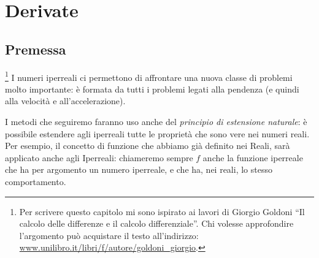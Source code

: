 



\chapter{Derivate}

% 

\section{Premessa}
\footnote{Per scrivere questo capitolo mi sono ispirato 
ai lavori di Giorgio Goldoni ``Il calcolo delle differenze e il calcolo 
differenziale''. 
Chi volesse approfondire l'argomento può acquistare il testo 
all'indirizzo: 
\href{https://www.unilibro.it/libri/f/autore/goldoni\_giorgio}
     {www.unilibro.it/libri/f/autore/goldoni\_giorgio}.}
I numeri iperreali ci permettono di affrontare una nuova classe di problemi 
molto importante: è formata da tutti i problemi legati alla pendenza (e 
quindi alla velocità e all'accelerazione).

I metodi che seguiremo faranno uso anche del \emph{principio di estensione 
naturale}: è possibile estendere agli iperreali tutte le proprietà che 
sono vere nei numeri reali.
Per esempio, il concetto di funzione che abbiamo già definito nei Reali, 
sarà applicato anche agli Iperreali: chiameremo sempre \(f\) anche
la funzione iperreale che ha per argomento un numero iperreale, 
e che ha, nei reali, lo stesso comportamento.

